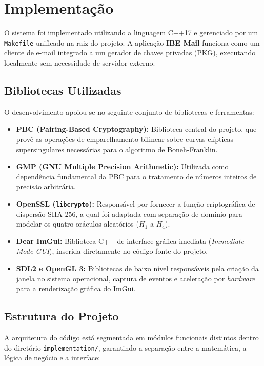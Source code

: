 \chapter{Implementação}
\label{cap:implementacao}

O sistema foi implementado utilizando a linguagem C++17 e gerenciado por um \texttt{Makefile} unificado na raiz do projeto. A aplicação \textbf{IBE Mail} funciona como um cliente de e-mail integrado a um gerador de chaves privadas (PKG), executando localmente sem necessidade de servidor externo.

\section{Bibliotecas Utilizadas}
\label{sec:bibliotecas}

O desenvolvimento apoiou-se no seguinte conjunto de bibliotecas e ferramentas:

\begin{itemize}
    \item \textbf{PBC (Pairing-Based Cryptography):} Biblioteca central do projeto, que provê as operações de emparelhamento bilinear sobre curvas elípticas supersingulares necessárias para o algoritmo de Boneh-Franklin.
    \item \textbf{GMP (GNU Multiple Precision Arithmetic):} Utilizada como dependência fundamental da PBC para o tratamento de números inteiros de precisão arbitrária.
    \item \textbf{OpenSSL (\texttt{libcrypto}):} Responsável por fornecer a função criptográfica de dispersão SHA-256, a qual foi adaptada com separação de domínio para modelar os quatro oráculos aleatórios ($H_1$ a $H_4$).
    \item \textbf{Dear ImGui:} Biblioteca C++ de interface gráfica imediata (\textit{Immediate Mode GUI}), inserida diretamente no código-fonte do projeto.
    \item \textbf{SDL2 e OpenGL 3:} Bibliotecas de baixo nível responsáveis pela criação da janela no sistema operacional, captura de eventos e aceleração por \textit{hardware} para a renderização gráfica do ImGui.
\end{itemize}

\section{Estrutura do Projeto}
\label{sec:estrutura}

A arquitetura do código está segmentada em módulos funcionais distintos dentro do diretório \texttt{implementation/}, garantindo a separação entre a matemática, a lógica de negócio e a interface:

